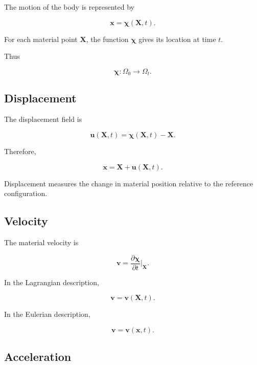 The motion of the body is represented by

\[
\boxed{
\mathbf{x}
=
\boldsymbol{\chi}(\mathbf{X},t).
}
\]

For each material point \(\mathbf{X}\), the function
\(\boldsymbol{\chi}\) gives its location at time \(t\).

Thus

\[
\boxed{
\boldsymbol{\chi}
:
\Omega_0
\to
\Omega_t.
}
\]

\subsection{Displacement}
\label{subsec:continuum-displacement}

The displacement field is

\[
\boxed{
\mathbf{u}(\mathbf{X},t)
=
\boldsymbol{\chi}(\mathbf{X},t)
-
\mathbf{X}.
}
\]

Therefore,

\[
\boxed{
\mathbf{x}
=
\mathbf{X}
+
\mathbf{u}(\mathbf{X},t).
}
\]

Displacement measures the change in material position relative to the
reference configuration.

\subsection{Velocity}
\label{subsec:continuum-velocity}

The material velocity is

\[
\boxed{
\mathbf{v}
=
\frac{\partial\boldsymbol{\chi}}
{\partial t}
\bigg|_{\mathbf{X}}.
}
\]

In the Lagrangian description,

\[
\mathbf{v}
=
\mathbf{v}(\mathbf{X},t).
\]

In the Eulerian description,

\[
\boxed{
\mathbf{v}
=
\mathbf{v}(\mathbf{x},t).
}
\]

\subsection{Acceleration}
\label{subsec:continuum-acceleration}

